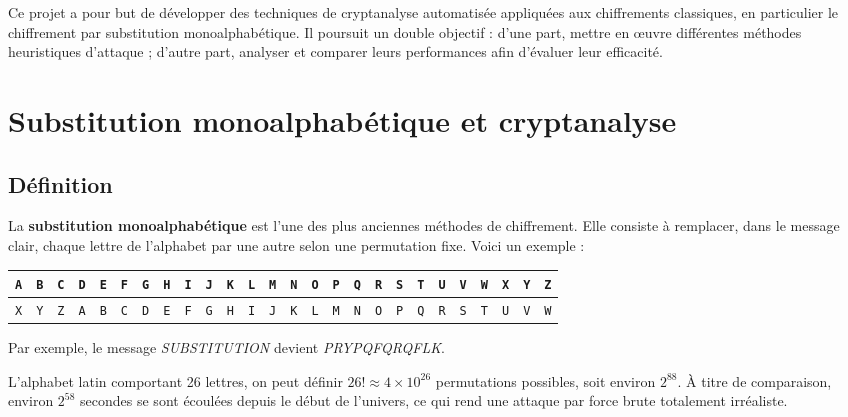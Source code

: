 \documentclass[a4paper]{article}
\begin{document}
Ce projet a pour but de développer des techniques de cryptanalyse automatisée appliquées aux chiffrements classiques, en particulier le chiffrement par substitution monoalphabétique. Il poursuit un double objectif : d’une part, mettre en œuvre différentes méthodes heuristiques d’attaque ; d’autre part, analyser et comparer leurs performances afin d’évaluer leur efficacité.

\section{Substitution monoalphabétique et cryptanalyse}

\subsection{Définition}

La \textbf{substitution monoalphabétique} est l’une des plus anciennes méthodes de chiffrement. Elle consiste à remplacer, dans le message clair, chaque lettre de l’alphabet par une autre selon une permutation fixe. Voici un exemple :

\vspace{1em}
\begin{adjustbox}{width=\textwidth,center}
    \begin{tabular}{|*{26}{c|}}
        \hline
        \texttt{A} & \texttt{B} & \texttt{C} & \texttt{D} & \texttt{E} & \texttt{F} & \texttt{G} & \texttt{H} & \texttt{I} & \texttt{J} & \texttt{K} & \texttt{L} & \texttt{M} & \texttt{N} & \texttt{O} & \texttt{P} & \texttt{Q} & \texttt{R} & \texttt{S} & \texttt{T} & \texttt{U} & \texttt{V} & \texttt{W} & \texttt{X} & \texttt{Y} & \texttt{Z} \\
        \hline
        \texttt{X} & \texttt{Y} & \texttt{Z} & \texttt{A} & \texttt{B} & \texttt{C} & \texttt{D} & \texttt{E} & \texttt{F} & \texttt{G} & \texttt{H} & \texttt{I} & \texttt{J} & \texttt{K} & \texttt{L} & \texttt{M} & \texttt{N} & \texttt{O} & \texttt{P} & \texttt{Q} & \texttt{R} & \texttt{S} & \texttt{T} & \texttt{U} & \texttt{V} & \texttt{W} \\
        \hline
    \end{tabular}
\end{adjustbox}

\vspace{1em}

Par exemple, le message \textit{SUBSTITUTION} devient \textit{PRYPQFQRQFLK}.

L’alphabet latin comportant 26 lettres, on peut définir $26! \approx 4 \times 10^{26}$ permutations possibles, soit environ $2^{88}$. À titre de comparaison, environ $2^{58}$ secondes se sont écoulées depuis le début de l’univers, ce qui rend une attaque par force brute totalement irréaliste.
\end{document}
